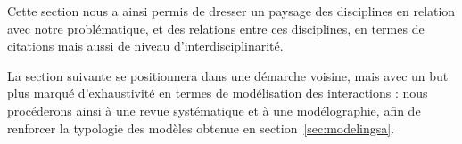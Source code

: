 \stars



Cette section nous a ainsi permis de dresser un paysage des disciplines en relation avec notre problématique, et des relations entre ces disciplines, en termes de citations mais aussi de niveau d'interdisciplinarité. 

La section suivante se positionnera dans une démarche voisine, mais avec un but plus marqué d'exhaustivité en termes de modélisation des interactions : nous procéderons ainsi à une revue systématique et à une modélographie, afin de renforcer la typologie des modèles obtenue en section~\ref{sec:modelingsa}.


\stars






